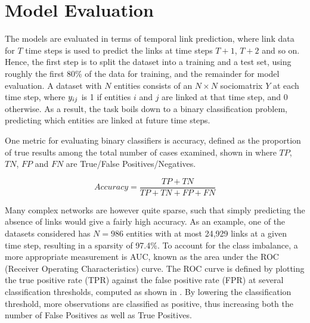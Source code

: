         
    
\section{Model Evaluation}
    
    The models are evaluated in terms of temporal link prediction, where link data for $T$ time steps is used to predict the links at time steps $T+1$, $T+2$ and so on. Hence, the first step is to split the dataset into a training and a test set, using roughly the first 80\% of the data for training, and the remainder for model evaluation. A dataset with $N$ entities consists of an $N\times N$ sociomatrix $Y$ at each time step, where $\sub(y)$ is 1 if entities $i$ and $j$ are linked at that time step, and 0 otherwise. As a result, the task boils down to a binary classification problem, predicting which entities are linked at future time steps.
    
    One metric for evaluating binary classifiers is accuracy, defined as the proportion of true results among the total number of cases examined, shown in  where $TP$, $TN$, $FP$ and $FN$ are True/False Positives/Negatives.
    
    \begin{equation}\label{eq:eval-accuracy}
        Accuracy = \frac{TP+TN}{TP+TN+FP+FN}
    \end{equation}
    
    Many complex networks are however quite sparse, such that simply predicting the absence of links would give a fairly high accuracy. As an example, one of the datasets considered has $N=986$ entities with at most 24,929 links at a given time step, resulting in a sparsity of 97.4\%. To account for the class imbalance, a more appropriate measurement is AUC, known as the area under the ROC (Receiver Operating Characteristics) curve. The ROC curve is defined by plotting the true positive rate (TPR) against the false positive rate (FPR) at several classification thresholds, computed as shown in . By lowering the classification threshold, more observations are classified as positive, thus increasing both the number of False Positives as well as True Positives.
    
